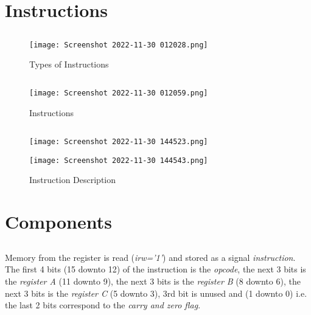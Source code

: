 \documentclass[10pt]{article}
\begin{document}
\section{\textbf{Instructions}}

\subsection{\textbf{\color{blue}{Types}}}
\begin{figure}[H]
    \centering
    \texttt{[image: Screenshot 2022-11-30 012028.png]}
    \caption{Types of Instructions}
    \label{fig:my_label1}
\end{figure}

\subsection{\textbf{\color{blue}{Instructions}}}
\begin{figure}[H]
    \centering
    \texttt{[image: Screenshot 2022-11-30 012059.png]}
    \caption{Instructions}
    \label{fig:my_label2}
\end{figure}

\subsection{\textbf{\color{blue}{Instruction Description}}}
\begin{figure}[H]
    \centering
    \texttt{[image: Screenshot 2022-11-30 144523.png]}
    \label{fig:my_label6}
\end{figure}

\begin{figure}[H]
    \centering
    \texttt{[image: Screenshot 2022-11-30 144543.png]}
	\caption{Instruction Description}
    \label{fig:my_label7}
\end{figure}

\newpage

\section{\textbf{Components}}

\subsection{\textbf{\color{blue}{Instruction Register}}}
Memory from the register is read (\textit{irw='1'}) and stored as a signal \textit{instruction}. The first 4 bits (15 downto 12) of the instruction is the \textit{opcode}, the next 3 bits is the \textit{register A} (11 downto 9), the next 3 bits is the \textit{register B} (8 downto 6), the next 3 bits is the \textit{register C} (5 downto 3), 3rd bit is unused and (1 downto 0) i.e. the last 2 bits correspond to the \textit{carry and zero flag}. 
\end{document}
